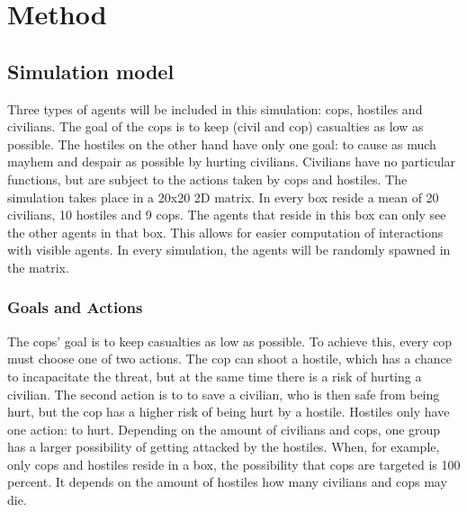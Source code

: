 \section{Method}
\subsection{Simulation model}
Three types of agents will be included in this simulation: cops, hostiles and civilians.
The goal of the cops is to keep (civil and cop) casualties as low as possible.
The hostiles on the other hand have only one goal: to cause as much mayhem and despair as possible by hurting civilians.
Civilians have no particular functions, but are subject to the actions taken by cops and hostiles.
The simulation takes place in a 20x20 2D matrix.
In every box reside a mean of 20 civilians, 10 hostiles and 9 cops.
The agents that reside in this box can only see the other agents in that box.
This allows for easier computation of interactions with visible agents.
In every simulation, the agents will be randomly spawned in the matrix.


\subsubsection{Goals and Actions}
The cops' goal is to keep casualties as low as possible.
To achieve this, every cop must choose one of two actions.
The cop can shoot a hostile, which has a chance to incapacitate the threat, but at the same time there is a risk of hurting a civilian.
The second action is to to save a civilian, who is then safe from being hurt, but the cop has a higher risk of being hurt by a hostile.
Hostiles only have one action: to hurt.
Depending on the amount of civilians and cops, one group has a larger possibility of getting attacked by the hostiles.
When, for example, only cops and hostiles reside in a box, the possibility that cops are targeted is 100 percent.
It depends on the amount of hostiles how many civilians and cops may die.


